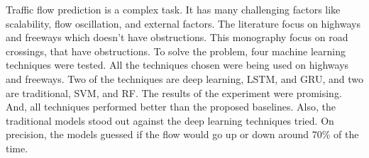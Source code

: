 Traffic flow prediction is a complex task. It has many challenging factors like scalability, flow oscillation, and external factors. The literature focus on highways and freeways which doesn't have obstructions. This monography focus on road crossings, that have obstructions. To solve the problem, four machine learning techniques were tested. All the techniques chosen were being used on highways and freeways. Two of the techniques are deep learning, \acrfull{LSTM}, and \acrfull{GRU},  and two are traditional, \acrfull{SVM}, and \acrfull{RF}. The results of the experiment were promising. And, all techniques performed better than the proposed baselines. Also, the traditional models stood out against the deep learning techniques tried. On precision, the models guessed if the flow would go up or down around 70\% of the time.